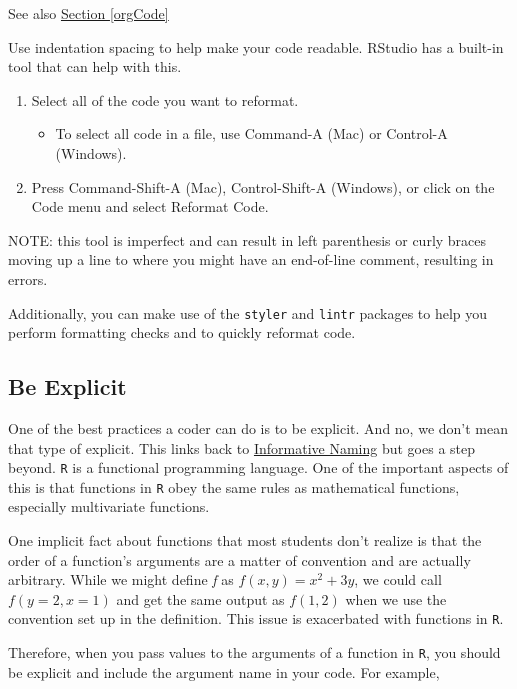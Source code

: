 \documentclass[
]{book}
\providecommand{\tightlist}{%
  \setlength{\itemsep}{0pt}\setlength{\parskip}{0pt}}
\begin{document}
See also \protect\hyperlink{orgCode}{Section \ref{orgCode}}

Use indentation spacing to help make your code readable. RStudio has a built-in tool that can help with this.

\begin{enumerate}
\def\labelenumi{\arabic{enumi}.}
\tightlist
\item
  Select all of the code you want to reformat.

  \begin{itemize}
  \tightlist
  \item
    To select all code in a file, use Command-A (Mac) or Control-A (Windows).
  \end{itemize}
\item
  Press Command-Shift-A (Mac), Control-Shift-A (Windows), or click on the Code menu and select Reformat Code.
\end{enumerate}

NOTE: this tool is imperfect and can result in left parenthesis or curly braces moving up a line to where you might have an end-of-line comment, resulting in errors.

Additionally, you can make use of the \texttt{styler} and \texttt{lintr} packages to help you perform formatting checks and to quickly reformat code.

\hypertarget{explicit}{%
\subsection{Be Explicit}\label{explicit}}

One of the best practices a coder can do is to be explicit. And no, we don't mean that type of explicit. This links back to \protect\hyperlink{naming}{Informative Naming} but goes a step beyond. \texttt{R} is a functional programming language. One of the important aspects of this is that functions in \texttt{R} obey the same rules as mathematical functions, especially multivariate functions.

One implicit fact about functions that most students don't realize is that the order of a function's arguments are a matter of convention and are actually arbitrary. While we might define \emph{f} as \(f(x,y) = x^2+3y\), we could call \(f(y=2,x=1)\) and get the same output as \(f(1,2)\) when we use the convention set up in the definition. This issue is exacerbated with functions in \texttt{R}.

Therefore, when you pass values to the arguments of a function in \texttt{R}, you should be explicit and include the argument name in your code. For example,
\end{document}
